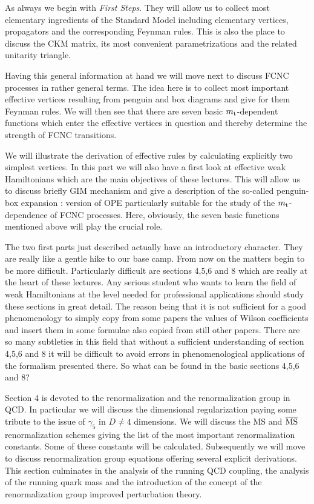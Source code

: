 \documentclass[12pt,rotate]{article}
\newcommand{\mt}{m_{\rm t}}
\begin{document}
As always we begin with {\it First Steps}. They will allow us to collect most
elementary ingredients of the Standard Model including elementary vertices,
propagators and the corresponding Feynman rules. This is also the place to
discuss the CKM matrix, its most convenient parametrizations and the related
unitarity triangle.

Having this general information at hand we will move next to discuss FCNC
processes in rather general terms. The idea here is to collect most important
effective vertices resulting from penguin and box diagrams and give for them
Feynman rules. We will then see that there are seven basic $\mt$-dependent
functions which enter the effective vertices in question and thereby
determine the strength of FCNC transitions. 

We will illustrate  the derivation of effective
rules by calculating explicitly two simplest vertices. 
In this part we will also have a first look at effective weak
Hamiltonians which are the main objectives of these lectures. This will allow
us to discuss briefly GIM mechanism \cite{GIM1} 
and give a description of the so-called
penguin-box expansion \cite{PBE0}: 
version of OPE particularly suitable for the study of
the $\mt$-dependence of FCNC processes. Here, obviously, the seven basic
functions mentioned above will play the crucial role.

The two first parts just described actually have an introductory character.
They are really like a gentle hike to our base  camp. From now on the matters
begin to be more difficult. Particularly difficult are sections 4,5,6 and 8
which are really at the heart of these lectures. Any serious student who
wants to learn the field of weak Hamiltonians at the level needed for
professional applications should study these sections in great detail. The
reason being that it is not sufficient for a good phenomenology to simply copy
from some papers the values of Wilson coefficients and insert them in some
formulae also copied from still other papers. There are so many subtleties in
this field that without a sufficient understanding of section 4,5,6 and 8 it
will be difficult to avoid errors in phenomenological applications of the
formalism presented there. So what can be found in the basic sections 4,5,6
and 8?

Section 4 is devoted to the renormalization and the renormalization group in
QCD. In particular we will discuss the dimensional regularization paying some
tribute to the issue of $\gamma_5$ in $D\not=4$ dimensions. We will discuss 
the MS and ${\rm \overline{MS}}$
renormalization schemes giving the list of the most important renormalization
constants. Some of these constants will be calculated. Subsequently we will
move to discuss renormalization group equations offering several explicit
derivations. This section culminates in the analysis of the running QCD
coupling, the analysis of the running quark mass and the introduction of
the concept of the renormalization group improved perturbation theory. 
\end{document}
